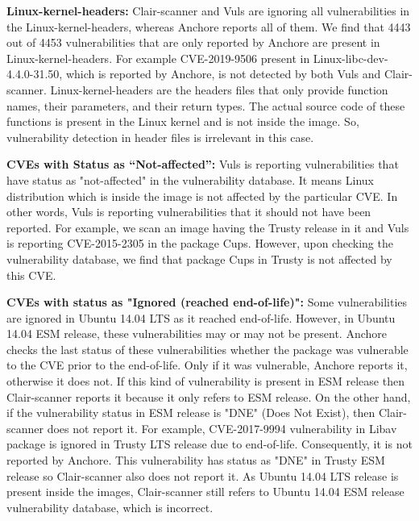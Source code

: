 \documentclass[a4paper,num-refs]{oup-contemporary}
\begin{document}
\textbf{Linux-kernel-headers:} Clair-scanner and Vuls are ignoring all vulnerabilities in the Linux-kernel-headers,
whereas Anchore reports all of them.
We find that 4443 out of 4453 vulnerabilities that are only reported by Anchore are present in Linux-kernel-headers.
For example CVE-2019-9506 present in Linux-libc-dev-4.4.0-31.50, which is reported by Anchore, is not
detected by both Vuls and Clair-scanner.
Linux-kernel-headers are the headers files that only provide function names, their parameters, and their
return types.
The actual source code of these functions is present in the Linux kernel and is not inside the image.
So, vulnerability detection in header files
is irrelevant in this case.

\textbf{CVEs with Status as “Not-affected”:} Vuls is reporting vulnerabilities that have status
as "not-affected" in the vulnerability database. It means Linux distribution which is inside the image is not affected
by the particular CVE. In other words, Vuls is reporting vulnerabilities that it should not have been reported.
For example, we scan an image having the Trusty release in it and Vuls is reporting CVE-2015-2305
in the package Cups. However, upon checking the vulnerability database, we find that package Cups in Trusty is not
affected by this CVE.

\textbf{CVEs with status as "Ignored (reached end-of-life)":}
Some vulnerabilities are ignored in Ubuntu 14.04 LTS as it reached end-of-life. 
However, in Ubuntu 14.04 ESM release, these vulnerabilities may or may not be present.
Anchore checks the last status of these vulnerabilities whether the package was vulnerable to the CVE
prior to the end-of-life. Only if it was vulnerable, Anchore reports it, otherwise it does not.
If this kind of vulnerability is present in ESM release then Clair-scanner reports it because it
only refers to ESM release. On the other hand, if the vulnerability
status in ESM release is "DNE" (Does Not Exist), then Clair-scanner does not report it. 
For example, CVE-2017-9994 vulnerability in Libav package is ignored in Trusty LTS release due to end-of-life.
Consequently, it is not reported by Anchore. This vulnerability has status as "DNE" in Trusty ESM
release so Clair-scanner also does not report it. As Ubuntu 14.04 LTS release is present inside the images,
Clair-scanner still refers to Ubuntu 14.04 ESM release vulnerability database, which is incorrect.
\end{document}
